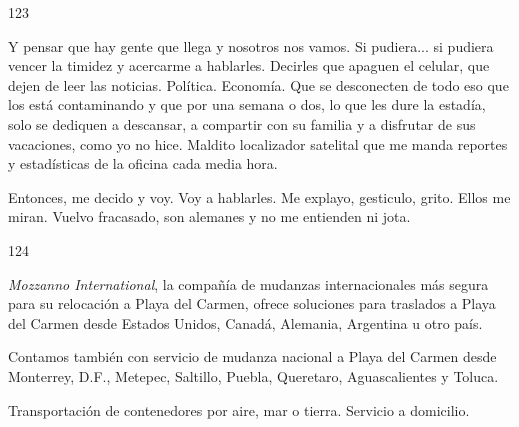 \documentclass[12pt,twoside,openright,a5paper]{book}
\begin{document}
\vspace{0.5cm}

\hrulefill \hspace{0.1cm}\decofourleft\hspace{0.2cm} 123 \hspace{0.2cm}\decofourright \hspace{0.1cm}\hrulefill

\nopagebreak

\vspace{0.5cm}

\nopagebreak

Y pensar que hay gente que llega y nosotros
nos vamos. Si pudiera... si pudiera vencer la timidez y acercarme
a hablarles. Decirles que apaguen el celular, que dejen de leer las
noticias. Política. Economía. Que se desconecten de todo eso que los está
contaminando y que por una semana o dos, lo que les dure la estadía, solo
se dediquen a descansar, a compartir con su familia y a disfrutar de sus
vacaciones, como yo no hice. Maldito localizador satelital que me manda
reportes y estadísticas de la oficina cada media hora.

Entonces, me decido y voy. Voy a hablarles. Me explayo, gesticulo,
grito. Ellos me miran. Vuelvo fracasado, son alemanes y no me entienden
ni jota.

\vspace{0.5cm}

\hrulefill \hspace{0.1cm}\decofourleft\hspace{0.2cm} 124 \hspace{0.2cm}\decofourright \hspace{0.1cm}\hrulefill

\nopagebreak

\vspace{0.5cm}

\nopagebreak

\emph{Mozzanno International}, la compañía de mudanzas internacionales más segura para
su relocación a Playa del Carmen, ofrece soluciones para traslados
a Playa del Carmen desde Estados Unidos, Canadá, Alemania, Argentina u otro país.

Contamos también con servicio de mudanza nacional a Playa del Carmen desde
Monterrey, D.F., Metepec, Saltillo, Puebla, Queretaro, Aguascalientes y Toluca.

Transportación de contenedores por aire, mar o tierra. Servicio a domicilio.
\end{document}
